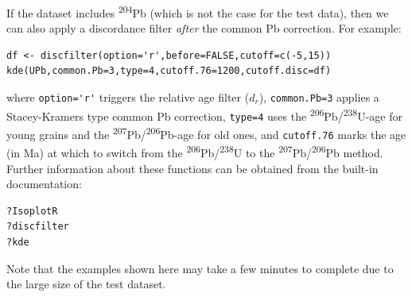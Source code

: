 \documentclass[gchron, manuscript]{copernicus}
\begin{document}
\noindent If the dataset includes \textsuperscript{204}Pb (which is
not the case for the test data), then we can also apply a discordance
filter \textit{after} the common Pb correction. For example:

\begin{verbatim}
df <- discfilter(option='r',before=FALSE,cutoff=c(-5,15))
kde(UPb,common.Pb=3,type=4,cutoff.76=1200,cutoff.disc=df)
\end{verbatim}

\noindent where \verb|option='r'| triggers the relative age filter
($d_r$), \texttt{common.Pb=3} applies a Stacey-Kramers type common Pb
correction, \texttt{type=4} uses the
\textsuperscript{206}Pb/\textsuperscript{238}U-age for young grains
and the \textsuperscript{207}Pb/\textsuperscript{206}Pb-age for old
ones, and \texttt{cutoff.76} marks the age (in Ma) at which to switch
from the \textsuperscript{206}Pb/\textsuperscript{238}U to the
\textsuperscript{207}Pb/\textsuperscript{206}Pb method. Further
information about these functions can be obtained from the built-in
documentation:

\begin{verbatim}
?IsoplotR
?discfilter
?kde
\end{verbatim}

\noindent Note that the examples shown here may take a few minutes to
complete due to the large size of the test dataset.

\noappendix       %





\end{document}
